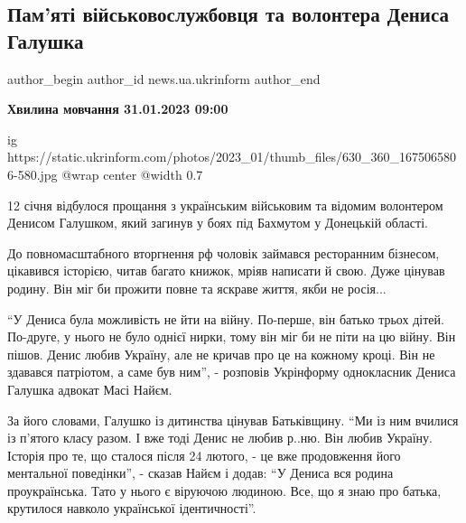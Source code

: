  
 
 
 
 
 
\subsection{Пам'яті військовослужбовця та волонтера Дениса Галушка}
\label{sec:12_01_2023.stz.news.ua.ukrinform.1.pamjati_denisa_galushko}
 
\ifcmt
 author_begin
   author_id news.ua.ukrinform
 author_end
\fi

\textbf{Хвилина мовчання 31.01.2023 09:00}

\ifcmt
  ig https://static.ukrinform.com/photos/2023_01/thumb_files/630_360_1675065806-580.jpg
  @wrap center
  @width 0.7
\fi

12 січня відбулося прощання з українським військовим та відомим волонтером
Денисом Галушком, який загинув у боях під Бахмутом у Донецькій області.

До повномасштабного вторгнення рф чоловік займався ресторанним бізнесом,
цікавився історією, читав багато книжок, мріяв написати й свою. Дуже цінував
родину. Він міг би прожити повне та яскраве життя, якби не росія...

\enquote{У Дениса була можливість не йти на війну. По-перше, він батько трьох дітей.
По-друге, у нього не було однієї нирки, тому він міг би не піти на цю війну.
Він пішов. Денис любив Україну, але не кричав про це на кожному кроці. Він не
здавався патріотом, а саме був ним}, - розповів Укрінформу однокласник Дениса
Галушка адвокат Масі Найєм.


За його словами, Галушко із дитинства цінував Батьківщину. \enquote{Ми із ним вчилися
із п'ятого класу разом. І вже тоді Денис не любив р..ню. Він любив Україну.
Історія про те, що сталося після 24 лютого, - це вже продовження його
ментальної поведінки}, - сказав Найєм і додав: \enquote{У Дениса вся родина
проукраїнська. Тато у нього є віруючою людиною. Все, що я знаю про батька,
крутилося навколо української ідентичності}.

